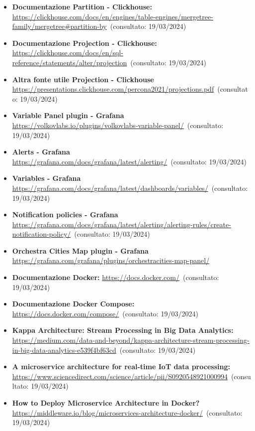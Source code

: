 \begin{itemize}
    \item \textbf{Documentazione Partition - Clickhouse:} \url{https://clickhouse.com/docs/en/engines/table-engines/mergetree-family/mergetree#partition-by}~(consultato: 19/03/2024)
    \item \textbf{Documentazione Projection - Clickhouse:} \url{https://clickhouse.com/docs/en/sql-reference/statements/alter/projection}~(consultato: 19/03/2024)
    \item \textbf{Altra fonte utile Projection - Clickhouse} \url{https://presentations.clickhouse.com/percona2021/projections.pdf}~(consultato: 19/03/2024)
    \item  \textbf{Variable Panel plugin - Grafana} \url{https://volkovlabs.io/plugins/volkovlabs-variable-panel/}~(consultato: 19/03/2024)
    \item  \textbf{Alerts - Grafana} \url{https://grafana.com/docs/grafana/latest/alerting/}~(consultato: 19/03/2024)
    \item \textbf{Variables - Grafana} \url{https://grafana.com/docs/grafana/latest/dashboards/variables/}~(consultato: 19/03/2024)
    \item  \textbf{Notification policies - Grafana} \url{https://grafana.com/docs/grafana/latest/alerting/alerting-rules/create-notification-policy/}~(consultato: 19/03/2024)
    \item  \textbf{Orchestra Cities Map plugin - Grafana} \url{https://grafana.com/grafana/plugins/orchestracities-map-panel/}
    \item \textbf{Documentazione Docker:} \url{https://docs.docker.com/}~(consultato: 19/03/2024)
    \item \textbf{Documentazione Docker Compose:} \url{https://docs.docker.com/compose/}~(consultato: 19/03/2024)
    \item \textbf{Kappa Architecture: Stream Processing in Big Data Analytics:} \url{https://medium.com/data-and-beyond/kappa-architecture-stream-processing-in-big-data-analytics-e539f4bf63cd}~(consultato: 19/03/2024)
    \item  \textbf{A microservice architecture for real-time IoT data processing:}  \url{https://www.sciencedirect.com/science/article/pii/S0920548921000994}~(consultato: 19/03/2024)
    \item \textbf{How to Deploy Microservice Architecture in Docker?} \url{https://middleware.io/blog/microservices-architecture-docker/}~(consultato: 19/03/2024)
\end{itemize}
